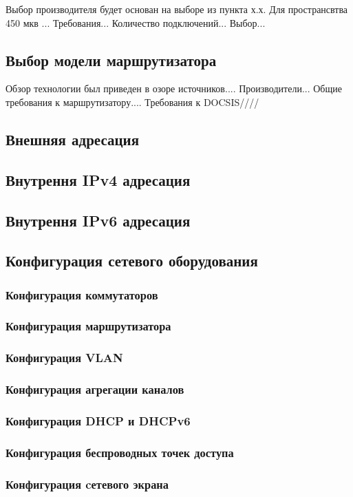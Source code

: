 Выбор производителя будет основан на выборе из пункта х.х. Для пространсвтва 450 мкв ...
Требования...
Количество подключений...
Выбор...

\subsection{Выбор модели маршрутизатора}
Обзор технологии был приведен в озоре источников....
Производители...
Общие требования к маршрутизатору....
Требования к DOCSIS////

\subsection{Внешняя адресация}
\subsection{Внутрення IPv4 адресация}
\subsection{Внутрення IPv6 адресация}
\subsection{Конфигурация сетевого оборудования}
\subsubsection{Конфигурация коммутаторов}
\subsubsection{Конфигурация маршрутизатора}
\subsubsection{Конфигурация VLAN}
\subsubsection{Конфигурация агрегации каналов}
\subsubsection{Конфигурация DHCP и DHCPv6}
\subsubsection{Конфигурация беспроводных точек доступа}
\subsubsection{Конфигурация cетевого экрана}
